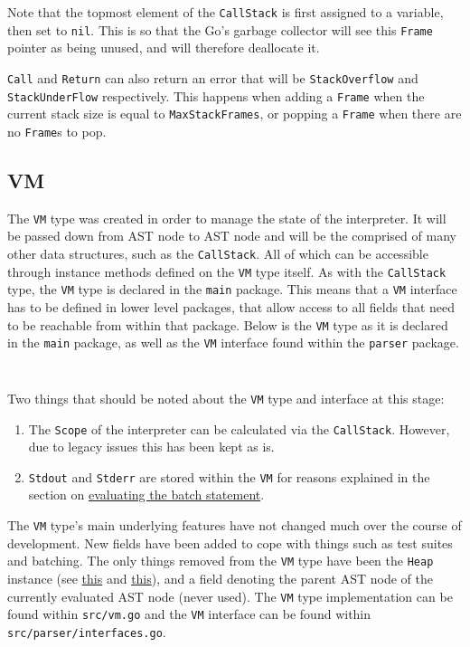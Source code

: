 \inputminted[firstline=140, lastline=151, autogobble, breaklines, tabsize=4]{go}{../../src/call.go}

Note that the topmost element of the \verb|CallStack| is first assigned to a variable, then set to \verb|nil|. This is so that the Go's garbage collector will see this \verb|Frame| pointer as being unused, and will therefore deallocate it.

\verb|Call| and \verb|Return| can also return an error that will be \verb|StackOverflow| and \verb|StackUnderFlow| respectively. This happens when adding a \verb|Frame| when the current stack size is equal to \verb|MaxStackFrames|, or popping a \verb|Frame| when there are no \verb|Frame|s to pop.

\subsection{VM}

The \verb|VM| type was created in order to manage the state of the interpreter. It will be passed down from AST node to AST node and will be the comprised of many other data structures, such as the \verb|CallStack|. All of which can be accessible through instance methods defined on the \verb|VM| type itself. As with the \verb|CallStack| type, the \verb|VM| type is declared in the \verb|main| package. This means that a \verb|VM| interface has to be defined in lower level packages, that allow access to all fields that need to be reachable from within that package. Below is the \verb|VM| type as it is declared in the \verb|main| package, as well as the \verb|VM| interface found within the \verb|parser| package.

\inputminted[firstline=15, lastline=37, autogobble, breaklines, tabsize=4]{go}{../../src/vm.go}

\inputminted[firstline=18, lastline=60, autogobble, breaklines, tabsize=4]{go}{../../src/parser/interfaces.go}

Two things that should be noted about the \verb|VM| type and interface at this stage:

\begin{enumerate}
    \item The \verb|Scope| of the interpreter can be calculated via the \verb|CallStack|. However, due to legacy issues this has been kept as is.
    \item \verb|Stdout| and \verb|Stderr| are stored within the \verb|VM| for reasons explained in the section on \hyperref[sec:eval-ast-nodes-batch]{evaluating the batch statement}.
\end{enumerate}

The \verb|VM| type's main underlying features have not changed much over the course of development. New fields have been added to cope with things such as test suites and batching. The only things removed from the \verb|VM| type have been the \verb|Heap| instance (see \hyperref[sec:data-structures-frames-callstack]{this} and \hyperref[sec:data-structures-heap]{this}), and a field denoting the parent AST node of the currently evaluated AST node (never used). The \verb|VM| type implementation can be found within \verb|src/vm.go| and the \verb|VM| interface can be found within \verb|src/parser/interfaces.go|.
